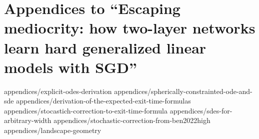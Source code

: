 \chapter[Escaping mediocrity]{Appendices to ``Escaping mediocrity: how two-layer networks learn hard generalized linear models with SGD''}
\label{chap:appendix-2305}

{appendices/explicit-odes-derivation}
{appendices/spherically-constrainted-ode-and-sde}
{appendices/derivation-of-the-expected-exit-time-formulas}
{appendices/stocastich-correction-to-exit-time-formula}
{appendices/sdes-for-arbitrary-width}
{appendices/stochastic-correction-from-ben2022high}
{appendices/landscape-geometry}
